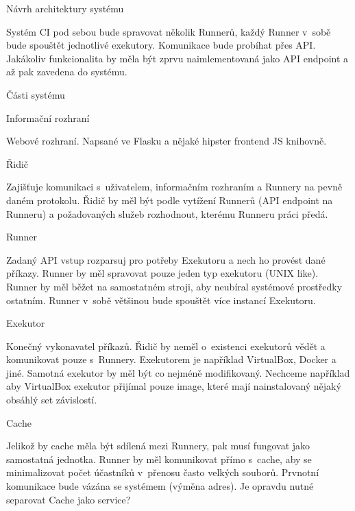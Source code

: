 \chap Návrh architektury systému

Systém CI pod sebou bude spravovat několik Runnerů, každý Runner v~sobě bude spouštět jednotlivé exekutory.
Komunikace bude probíhat přes API.
Jakákoliv funkcionalita by měla být zprvu naimlementovaná jako API endpoint a až pak zavedena do systému.

\sec Části systému

\secc Informační rozhraní

Webové rozhraní.
Napsané ve Flasku a nějaké hipster frontend JS knihovně.

\secc Řidič

Zajišťuje komunikaci s~uživatelem, informačním rozhraním a Runnery na pevně daném protokolu.
Řidič by měl být podle vytížení Runnerů (API endpoint na Runneru) a požadovaných služeb rozhodnout, kterému Runneru práci předá.

\secc Runner

Zadaný API vstup rozparsuj pro potřeby Exekutoru a nech ho provést dané příkazy.
Runner by měl spravovat pouze jeden typ exekutoru (UNIX like).
Runner by měl běžet na samostatném stroji, aby neubíral systémové prostředky ostatním.
Runner v~sobě většinou bude spouštět více instancí Exekutoru.

\seccc Exekutor

Konečný vykonavatel příkazů. Řidič by neměl o~existenci exekutorů vědět a komunikovat pouze s~Runnery.
Exekutorem je například VirtualBox, Docker a jiné.
Samotná exekutor by měl být co nejméně modifikovaný.
Nechceme například aby VirtualBox exekutor přijímal pouze image, které mají nainstalovaný nějaký obsáhlý set závislostí.

\secc Cache

Jelikož by cache měla být sdílená mezi Runnery, pak musí fungovat jako samostatná jednotka.
Runner by měl komunikovat přímo s~cache, aby se minimalizovat počet účastníků v~přenosu často velkých souborů.
Prvnotní komunikace bude vázána se systémem (výměna adres).
Je opravdu nutné separovat Cache jako service?





